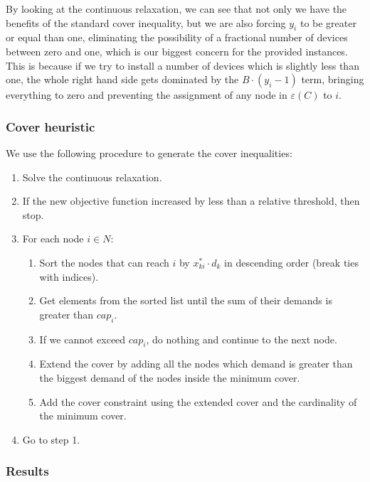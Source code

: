 By looking at the continuous relaxation, we can see that not only we have the benefits of the standard cover inequality, but we are also forcing $y_i$ to be greater or equal than one, eliminating the possibility of a fractional number of devices between zero and one, which is our biggest concern for the provided instances. This is because if we try to install a number of devices which is slightly less than one, the whole right hand side gets dominated by the $B \cdot (y_i - 1)$ term, bringing everything to zero and preventing the assignment of any node in $\varepsilon(C)$ to $i$.

\newpage
\subsubsection*{Cover heuristic}

We use the following procedure to generate the cover inequalities:
\begin{enumerate}
	\item Solve the continuous relaxation.
	\item If the new objective function increased by less than a relative threshold, then stop.
	\item For each node $i \in N$:
	\begin{enumerate}[label*=\arabic*.]
		\item Sort the nodes that can reach $i$ by $x^*_{ki} \cdot d_k$ in descending order (break ties with indices).
		\item Get elements from the sorted list until the sum of their demands is greater than $cap_i$.
		\item If we cannot exceed $cap_i$, do nothing and continue to the next node.
		\item Extend the cover by adding all the nodes which demand is greater than the biggest demand of the nodes inside the minimum cover.
		\item Add the cover constraint using the extended cover and the cardinality of the minimum cover.
	\end{enumerate}
	\item Go to step 1.
\end{enumerate}

\newpage
\subsubsection*{Results}

